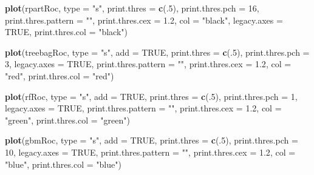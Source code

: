 \documentclass[12pt,]{krantz}
\makeatletter
\newenvironment{Shaded}{\begin{snugshade}}{\end{snugshade}}
\newcommand{\DataTypeTok}[1]{\textcolor[rgb]{0.27,0.27,0.27}{#1}}
\newcommand{\DecValTok}[1]{\textcolor[rgb]{0.06,0.06,0.06}{#1}}
\newcommand{\FloatTok}[1]{\textcolor[rgb]{0.06,0.06,0.06}{#1}}
\newcommand{\KeywordTok}[1]{\textcolor[rgb]{0.27,0.27,0.27}{\textbf{#1}}}
\newcommand{\NormalTok}[1]{#1}
\newcommand{\OtherTok}[1]{\textcolor[rgb]{0.37,0.37,0.37}{#1}}
\newcommand{\StringTok}[1]{\textcolor[rgb]{0.5,0.5,0.5}{#1}}
\newenvironment{kframe}{%
\medskip{}
\setlength{\fboxsep}{.8em}
 \def\at@end@of@kframe{}%
 \ifinner\ifhmode%
  \def\at@end@of@kframe{\end{minipage}}%
  \begin{minipage}{\columnwidth}%
 \fi\fi%
 \def\FrameCommand##1{\hskip\@totalleftmargin \hskip-\fboxsep
 \colorbox{shadecolor}{##1}\hskip-\fboxsep
     \hskip-\linewidth \hskip-\@totalleftmargin \hskip\columnwidth}%
 \MakeFramed {\advance\hsize-\width
   \@totalleftmargin\z@ \linewidth\hsize
   \@setminipage}}%
 {\par\unskip\endMakeFramed%
 \at@end@of@kframe}
\renewenvironment{Shaded}{\begin{kframe}}{\end{kframe}}
\makeatother
\begin{document}
\begin{Shaded}
\begin{Highlighting}[]
\KeywordTok{plot}\NormalTok{(rpartRoc, }\DataTypeTok{type =} \StringTok{"s"}\NormalTok{, }\DataTypeTok{print.thres =} \KeywordTok{c}\NormalTok{(.}\DecValTok{5}\NormalTok{),}
     \DataTypeTok{print.thres.pch =} \DecValTok{16}\NormalTok{,}
     \DataTypeTok{print.thres.pattern =} \StringTok{""}\NormalTok{,}
     \DataTypeTok{print.thres.cex =} \FloatTok{1.2}\NormalTok{,}
     \DataTypeTok{col =} \StringTok{"black"}\NormalTok{, }\DataTypeTok{legacy.axes =} \OtherTok{TRUE}\NormalTok{,}
     \DataTypeTok{print.thres.col =} \StringTok{"black"}\NormalTok{)}

\KeywordTok{plot}\NormalTok{(treebagRoc, }\DataTypeTok{type =} \StringTok{"s"}\NormalTok{, }\DataTypeTok{add =} \OtherTok{TRUE}\NormalTok{, }\DataTypeTok{print.thres =} \KeywordTok{c}\NormalTok{(.}\DecValTok{5}\NormalTok{), }
     \DataTypeTok{print.thres.pch =} \DecValTok{3}\NormalTok{, }\DataTypeTok{legacy.axes =} \OtherTok{TRUE}\NormalTok{, }\DataTypeTok{print.thres.pattern =} \StringTok{""}\NormalTok{, }
     \DataTypeTok{print.thres.cex =} \FloatTok{1.2}\NormalTok{,}
     \DataTypeTok{col =} \StringTok{"red"}\NormalTok{, }\DataTypeTok{print.thres.col =} \StringTok{"red"}\NormalTok{)}

\KeywordTok{plot}\NormalTok{(rfRoc, }\DataTypeTok{type =} \StringTok{"s"}\NormalTok{, }\DataTypeTok{add =} \OtherTok{TRUE}\NormalTok{, }\DataTypeTok{print.thres =} \KeywordTok{c}\NormalTok{(.}\DecValTok{5}\NormalTok{), }
     \DataTypeTok{print.thres.pch =} \DecValTok{1}\NormalTok{, }\DataTypeTok{legacy.axes =} \OtherTok{TRUE}\NormalTok{, }\DataTypeTok{print.thres.pattern =} \StringTok{""}\NormalTok{, }
     \DataTypeTok{print.thres.cex =} \FloatTok{1.2}\NormalTok{,}
     \DataTypeTok{col =} \StringTok{"green"}\NormalTok{, }\DataTypeTok{print.thres.col =} \StringTok{"green"}\NormalTok{)}

\KeywordTok{plot}\NormalTok{(gbmRoc, }\DataTypeTok{type =} \StringTok{"s"}\NormalTok{, }\DataTypeTok{add =} \OtherTok{TRUE}\NormalTok{, }\DataTypeTok{print.thres =} \KeywordTok{c}\NormalTok{(.}\DecValTok{5}\NormalTok{), }
     \DataTypeTok{print.thres.pch =} \DecValTok{10}\NormalTok{, }\DataTypeTok{legacy.axes =} \OtherTok{TRUE}\NormalTok{, }\DataTypeTok{print.thres.pattern =} \StringTok{""}\NormalTok{, }
     \DataTypeTok{print.thres.cex =} \FloatTok{1.2}\NormalTok{,}
     \DataTypeTok{col =} \StringTok{"blue"}\NormalTok{, }\DataTypeTok{print.thres.col =} \StringTok{"blue"}\NormalTok{)}


\end{Highlighting}
\end{Shaded}
\end{document}
